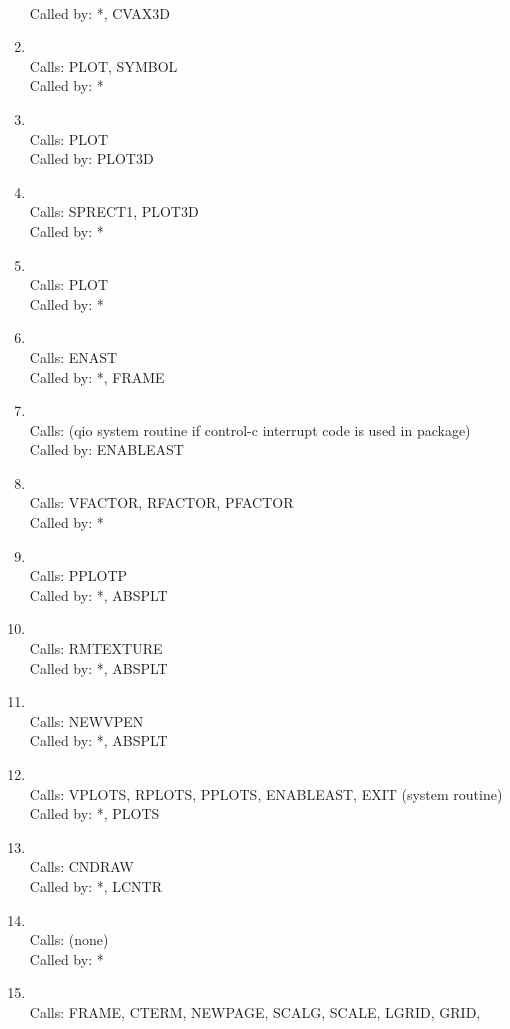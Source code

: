 \documentclass[11pt]{report}
\begin{document}
\begin{enumerate}
\\ Called by: *, CVAX3D
\item {}
\\ Calls:  PLOT, SYMBOL
\\ Called by: *
\item {}
\\ Calls:  PLOT
\\ Called by: PLOT3D
\item {}
\\ Calls:  SPRECT1, PLOT3D
\\ Called by: *
\item {}
\\ Calls:  PLOT
\\ Called by: *
\item {}
\\ Calls: ENAST
\\ Called by: *, FRAME
\item {}
\\ Calls: (qio system routine if control-c interrupt code is used in package)
\\ Called by: ENABLEAST
\item {}
\\ Calls:  VFACTOR, RFACTOR, PFACTOR
\\ Called by: *
\item {}
\\ Calls:  PPLOTP
\\ Called by: *, ABSPLT
\item {}
\\ Calls:  RMTEXTURE
\\ Called by: *, ABSPLT
\item {}
\\ Calls:  NEWVPEN
\\ Called by: *, ABSPLT
\item {}
\\ Calls:  VPLOTS, RPLOTS, PPLOTS, ENABLEAST, EXIT (system routine)
\\ Called by: *, PLOTS
\item {}
\\ Calls:  CNDRAW
\\ Called by: *, LCNTR
\item {}
\\ Calls:  (none)
\\ Called by: *
\item {}
\\ Calls:  FRAME, CTERM, NEWPAGE, SCALG, SCALE, LGRID, GRID,

\end{enumerate}
\end{document}
